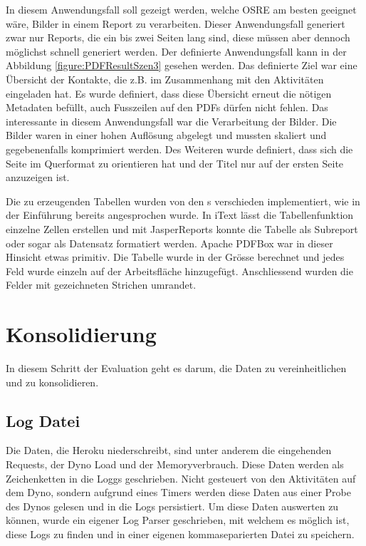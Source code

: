 \documentclass[main.tex]{subfiles}
\begin{document}
In diesem Anwendungsfall soll gezeigt werden, welche OSRE am besten geeignet wäre, Bilder in einem Report zu verarbeiten. Dieser Anwendungsfall generiert zwar nur Reports, die ein bis zwei Seiten lang sind, diese müssen aber dennoch möglichst schnell generiert werden. Der definierte Anwendungsfall kann in der Abbildung \ref{figure:PDFResultSzen3} gesehen werden. Das definierte Ziel war eine Übersicht der Kontakte, die z.B. im Zusammenhang mit den Aktivitäten eingeladen hat. Es wurde definiert, dass diese Übersicht erneut die nötigen Metadaten befüllt, auch Fusszeilen auf den PDFs dürfen nicht fehlen. Das interessante in diesem Anwendungsfall war die Verarbeitung der Bilder. Die Bilder waren in einer hohen Auflösung abgelegt und mussten skaliert und gegebenenfalls komprimiert werden. Des Weiteren wurde definiert, dass sich die Seite im Querformat zu orientieren hat und der Titel nur auf der ersten Seite anzuzeigen ist.

Die zu erzeugenden Tabellen wurden von den s verschieden implementiert, wie in der Einführung bereits angesprochen wurde. In iText lässt die Tabellenfunktion einzelne Zellen erstellen und mit JasperReports konnte die Tabelle als Subreport oder sogar als Datensatz formatiert werden. Apache PDFBox war in dieser Hinsicht etwas primitiv. Die Tabelle wurde in der Grösse berechnet und jedes Feld wurde einzeln auf der Arbeitsfläche hinzugefügt. Anschliessend wurden die Felder mit gezeichneten Strichen umrandet.




\section{Konsolidierung}
In diesem Schritt der Evaluation geht es darum, die Daten zu vereinheitlichen und zu konsolidieren.

\subsection{Log Datei}

Die Daten, die Heroku niederschreibt, sind unter anderem die eingehenden Requests, der Dyno Load und der Memoryverbrauch. Diese Daten werden als Zeichenketten in die Loggs geschrieben. Nicht gesteuert von den Aktivitäten auf dem Dyno, sondern aufgrund eines Timers werden diese Daten aus einer Probe des Dynos gelesen und in die Logs persistiert. Um diese Daten auswerten zu können, wurde ein eigener Log Parser geschrieben, mit welchem es möglich ist, diese Logs zu finden und in einer eigenen kommaseparierten Datei zu speichern.
\end{document}

